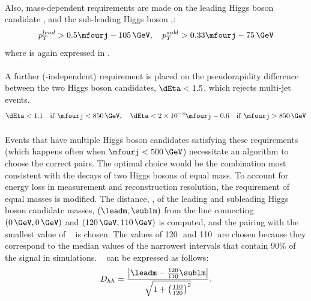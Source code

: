 \paragraph{}
Also, mass-dependent requirements are made on the leading Higgs boson candidate \pt, and the sub-leading Higgs boson \pt,:
\begin{equation}
p_T^{lead} > 0.5\mfourj - 105\,\GeV, \quad
p_T^{subl} > 0.33\mfourj - 75\,\GeV
\end{equation}
where \mfourj is again expressed in \GeV.

\paragraph{}
A further (\mfourj-independent) requirement is placed on the pseudorapidity difference between the two Higgs boson candidates, $\dEta < 1.5$, which rejects multi-jet events.
\begin{equation}
\dEta < 1.1 \quad \mathrm{if}\ \mfourj < 850\,\GeV , \quad
\dEta < 2\times10^{-3} \mfourj - 0.6 \quad \mathrm{if}\ \mfourj > 850\,\GeV
\end{equation}

\paragraph{}
Events that have multiple Higgs boson candidates satisfying these requirements (which happens often when $\mfourj < 500\,\GeV$) necessitate an algorithm to choose the correct pairs. 
The optimal choice would be the combination most consistent with the decays of two Higgs bosons of equal mass.
To account for energy loss in measurement and reconstruction resolution, the requirement of equal masses is modified. 
The distance, \Dhh, of the leading and subleading Higgs boson candidate masses, $\left(\leadm, \sublm\right)$ from the line connecting $\left(0\,\GeV, 0\,\GeV\right)$ and $\left(120\,\GeV, 110\,\GeV\right)$ is computed, and the pairing with the smallest value of \Dhh~ is chosen.
The values of 120\,\GeV\, and 110\,\GeV\, are chosen because they correspond to the median values of the narrowest intervals that contain 90\% of the signal in simulations.%
\Dhh~ can be expressed as follows:
\begin{equation}
D_{hh} = \frac{\left|\leadm - \frac{120}{110}\sublm\right|}{\sqrt{1+\left(\frac{110}{120}\right)^{2}}}.
\end{equation}

